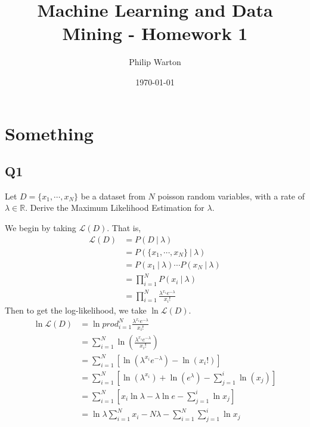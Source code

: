 \documentclass{article}
\theoremstyle{definition}
\begin{document}
\title{Machine Learning and Data Mining - Homework 1}
\author{Philip Warton}
\date{\today}
\maketitle
\section{Something}
    \subsection{Q1}
        \begin{mdframed}[]
            Let $D = \{x_1,\cdots,x_N\}$ be a dataset from $N$ poisson random variables, with a rate 
            of $\lambda \in \mathbb{R}$. Derive the Maximum Likelihood Estimation for $\lambda$.
        \end{mdframed}
        We begin by taking $\mathcal{L}(D)$. That is,
        \begin{align*}
            \mathcal{L}(D) &= P(D \ | \ \lambda) \\
            &=P(\{x_1,\cdots,x_N\} \ | \ \lambda) \\
            &=P(x_1 \ | \ \lambda ) \cdots P(x_N \ | \ \lambda) \\
            &= \prod_{i = 1}^NP(x_i \ | \ \lambda) \\
            &= \prod_{i = 1}^N \frac{\lambda^{x_i}e^{-\lambda}}{x_i!}
        \end{align*}
        Then to get the log-likelihood, we take $\ln \mathcal{L}(D)$.
        \begin{align*}
            \ln\mathcal{L}(D) &= \ln prod_{i = 1}^N \frac{\lambda^{x_i}e^{-\lambda}}{x_i!}\\
            &= \sum_{i=1}^N \ln \left( \frac{\lambda^{x_i}e^{-\lambda}}{x_i!} \right) \\
            &= \sum_{i=1}^N \left[
                \ln(\lambda^{x_i}e^{-\lambda}) - \ln(x_i!)
            \right] \\
            &= \sum_{i=1}^N \left[
                \ln(\lambda^{x_i}) + \ln(e^{\lambda}) - \sum_{j=1}^i\ln(x_j)
            \right]\\
            &= \sum_{i = 1}^N \left[
                x_i \ln \lambda - \lambda \ln e - \sum_{j = 1}^i \ln x_j
            \right]\\
            &=\ln \lambda \sum_{i = 1}^Nx_i - N\lambda - \sum_{i = 1}^N \sum_{j = 1}^i \ln x_j
        \end{align*}
\end{document}
